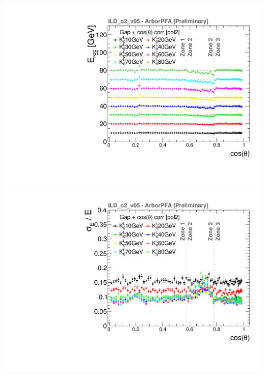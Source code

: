 \documentclass[8pt]{beamer}
\begin{document}
\begin{frame}
\begin{minipage}{0.5\linewidth}
\begin{center}
\begin{overprint}
           \centering \includegraphics[width=0.8\linewidth]{ERecCorrThetaGapO2_thesis.pdf} \\ \includegraphics[width=0.8\linewidth]{EResCorrThetaGapO2_thesis.pdf}
        \end{overprint}
      \end{center}
    \end{minipage}
  \end{frame}
\end{document}
